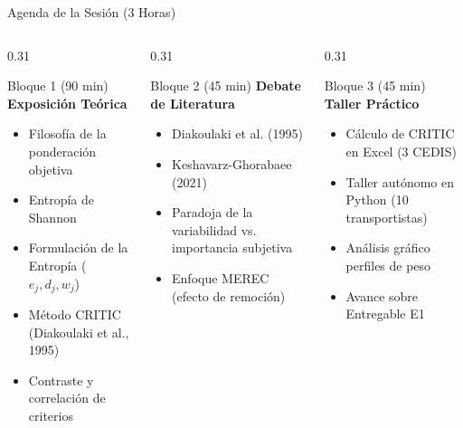 \documentclass[aspectratio=169, 10pt]{beamer}
\begin{document}
\begin{frame}{Agenda de la Sesión (3 Horas)}
    \begin{columns}[T]
        \begin{column}{0.31\textwidth}
            \begin{block}{Bloque 1 (90 min)}
                \textbf{Exposición Teórica}
                \begin{itemize}
                    \scriptsize
                    \item Filosofía de la ponderación objetiva
                    \item Entropía de Shannon
                    \item Formulación de la Entropía ($e_j, d_j, w_j$)
                    \item Método CRITIC (Diakoulaki et al., 1995)
                    \item Contraste y correlación de criterios
                \end{itemize}
            \end{block}
        \end{column}
        
        \begin{column}{0.31\textwidth}
            \begin{exampleblock}{Bloque 2 (45 min)}
                \textbf{Debate de Literatura}
                \begin{itemize}
                    \scriptsize
                    \item Diakoulaki et al. (1995)
                    \item Keshavarz-Ghorabaee (2021)
                    \item Paradoja de la variabilidad vs. importancia subjetiva
                    \item Enfoque MEREC (efecto de remoción)
                \end{itemize}
            \end{exampleblock}
        \end{column}
        
        \begin{column}{0.31\textwidth}
            \begin{alertblock}{Bloque 3 (45 min)}
                \textbf{Taller Práctico}
                \begin{itemize}
                    \scriptsize
                    \item Cálculo de CRITIC en Excel (3 CEDIS)
                    \item Taller autónomo en Python (10 transportistas)
                    \item Análisis gráfico perfiles de peso
                    \item Avance sobre Entregable E1
                \end{itemize}
            \end{alertblock}
        \end{column}
    \end{columns}
\end{frame}
\end{document}
